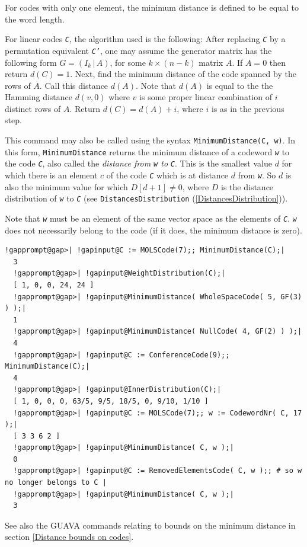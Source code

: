 \documentclass[a4paper,11pt]{report}
\begin{document}
{{{ For codes with only one element, the minimum distance is defined to be equal
to the word length. 

 For linear codes \mbox{\texttt{\mdseries\slshape C}}, the algorithm used is the following: After replacing \mbox{\texttt{\mdseries\slshape C}} by a permutation equivalent \mbox{\texttt{\mdseries\slshape C'}}, one may assume the generator matrix has the following form $G=(I_{k} \, | \, A)$, for some $k\times (n-k)$ matrix $A$. If $A=0$ then return $d(C)=1$. Next, find the minimum distance of the code spanned by the rows of $A$. Call this distance $d(A)$. Note that $d(A)$ is equal to the the Hamming distance $d(v,0)$ where $v$ is some proper linear combination of $i$ distinct rows of $A$. Return $d(C)=d(A)+i$, where $i$ is as in the previous step. 

 This command may also be called using the syntax \texttt{MinimumDistance(C, w)}. In this form, \texttt{MinimumDistance} returns the minimum distance of a codeword \mbox{\texttt{\mdseries\slshape w}} to the code \mbox{\texttt{\mdseries\slshape C}}, also called the \emph{distance from \mbox{\texttt{\mdseries\slshape w}} to} \mbox{\texttt{\mdseries\slshape C}}. This is the smallest value $d$ for which there is an element $c$ of the code \mbox{\texttt{\mdseries\slshape C}} which is at distance $d$ from \mbox{\texttt{\mdseries\slshape w}}. So $d$ is also the minimum value for which $D[d+1] \neq 0$, where $D$ is the distance distribution of \mbox{\texttt{\mdseries\slshape w}} to \mbox{\texttt{\mdseries\slshape C}} (see \texttt{DistancesDistribution} (\ref{DistancesDistribution})). 

 Note that \mbox{\texttt{\mdseries\slshape w}} must be an element of the same vector space as the elements of \mbox{\texttt{\mdseries\slshape C}}. \mbox{\texttt{\mdseries\slshape w}} does not necessarily belong to the code (if it does, the minimum distance is
zero). }

 
\begin{Verbatim}[commandchars=!@|,fontsize=\small,frame=single,label=Example]
  !gapprompt@gap>| !gapinput@C := MOLSCode(7);; MinimumDistance(C);|
  3
  !gapprompt@gap>| !gapinput@WeightDistribution(C);|
  [ 1, 0, 0, 24, 24 ]
  !gapprompt@gap>| !gapinput@MinimumDistance( WholeSpaceCode( 5, GF(3) ) );|
  1
  !gapprompt@gap>| !gapinput@MinimumDistance( NullCode( 4, GF(2) ) );|
  4
  !gapprompt@gap>| !gapinput@C := ConferenceCode(9);; MinimumDistance(C);|
  4
  !gapprompt@gap>| !gapinput@InnerDistribution(C);|
  [ 1, 0, 0, 0, 63/5, 9/5, 18/5, 0, 9/10, 1/10 ]
  !gapprompt@gap>| !gapinput@C := MOLSCode(7);; w := CodewordNr( C, 17 );|
  [ 3 3 6 2 ]
  !gapprompt@gap>| !gapinput@MinimumDistance( C, w );|
  0
  !gapprompt@gap>| !gapinput@C := RemovedElementsCode( C, w );; # so w no longer belongs to C |
  !gapprompt@gap>| !gapinput@MinimumDistance( C, w );|
  3
\end{Verbatim}
  See also the \textsf{GUAVA} commands relating to bounds on the minimum distance in section \ref{Distance bounds on codes}. 

}}
\end{document}
